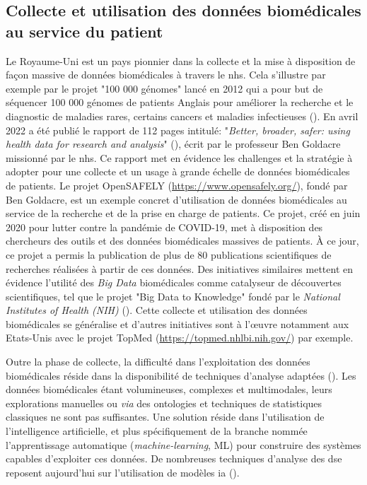 \subsection{Collecte et utilisation des données biomédicales au service du patient}
Le Royaume-Uni est un pays pionnier dans la collecte et la mise à disposition de façon massive de données biomédicales à travers le \gls{nhs}. Cela s'illustre par exemple par le projet "100 000 génomes" lancé en 2012 qui a pour but de séquencer 100 000 génomes de patients Anglais pour améliorer la recherche et le diagnostic de maladies rares, certains cancers et maladies infectieuses (\cite{nunn_public_2019}). En avril 2022 a été publié le rapport de 112 pages intitulé: "\textit{Better, broader, safer: using health data for research and analysis}" (\cite{ben_goldacre_better_2022}), écrit par le professeur Ben Goldacre missionné par le \gls{nhs}. Ce rapport met en évidence les challenges et la stratégie à adopter pour une collecte et un usage à grande échelle de données biomédicales de patients. Le projet OpenSAFELY (\href{https://www.opensafely.org/}{https://www.opensafely.org/}), fondé par Ben Goldacre, est un exemple concret d'utilisation de données biomédicales au service de la recherche et de la prise en charge de patients. Ce projet, créé en juin 2020 pour lutter contre la pandémie de COVID-19, met à disposition des chercheurs des outils et des données biomédicales massives de patients. À ce jour, ce projet a permis la publication de plus de 80 publications scientifiques de recherches réalisées à partir de ces données. Des initiatives similaires mettent en évidence l'utilité des \textit{Big Data} biomédicales comme catalyseur de découvertes scientifiques, tel que le projet "Big Data to Knowledge" fondé par le \textit{National Institutes of Health (NIH)} (\cite{toga_big_2015}). Cette collecte et utilisation des données biomédicales se généralise et d'autres initiatives sont à l'œuvre notamment aux Etats-Unis avec le projet TopMed (\url{https://topmed.nhlbi.nih.gov/}) par exemple.

Outre la phase de collecte, la difficulté dans l'exploitation des données biomédicales réside dans la disponibilité de techniques d'analyse adaptées (\cite{wang_big_2019, ismail_requirements_2020}). Les données biomédicales étant volumineuses, complexes et multimodales, leurs explorations manuelles ou \textit{via} des ontologies et techniques de statistiques classiques ne sont pas suffisantes. Une solution réside dans l'utilisation de l'intelligence artificielle, et plus spécifiquement de la branche nommée l'apprentissage automatique (\textit{machine-learning}, ML) pour construire des systèmes capables d'exploiter ces données. De nombreuses techniques d'analyse des \gls{dse} reposent aujourd'hui sur l'utilisation de modèles \gls{ia} (\cite{yang_large_2022, de_mello_semantic_2022, li_electronic_2022}).

